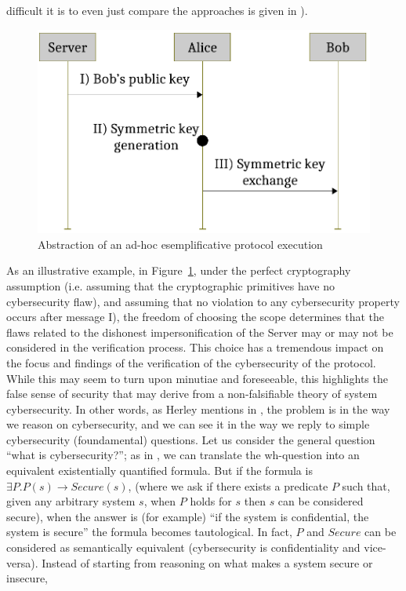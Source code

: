 \documentclass[conference]{IEEEtran}
\begin{document}
difficult it is to even just compare the approaches is given in
\autocite{Cremers2009comparing}). 
\begin{figure}[t]
	\centering
	\includegraphics[width=.7\columnwidth]{protocol-example.pdf}
	\caption{Abstraction of an ad-hoc esemplificative protocol execution}
	\label{fig:protocol-example}
\end{figure}
As an illustrative example, in Figure~\ref{fig:protocol-example}, under the
perfect cryptography assumption (i.e. assuming that the cryptographic
primitives have no cybersecurity flaw), and assuming that no violation to any
cybersecurity property occurs after message I), the freedom of choosing the
scope determines that the flaws related to the dishonest impersonification of
the Server may or may not be considered in the verification process.  This
choice has a tremendous impact on the focus and findings of the verification of
the cybersecurity of the protocol.  While this may seem to turn upon minutiae
and foreseeable, this highlights the false sense of security that may derive
from a non-falsifiable theory of system cybersecurity.  In other words, as
Herley mentions in \autocite{Herley2016usenixvideo}, the problem is in the way
we reason on cybersecurity, and we can see it in the way we reply to simple
cybersecurity (foundamental) questions.  Let us consider the general question
``what is cybersecurity?''; as in \autocite{hintikka2013inquiry}, we can
translate the wh-question into an equivalent existentially quantified formula.
But if the formula is $\exists P. P(s)\rightarrow Secure(s)$, (where we ask if
there exists a predicate $P$ such that, given any arbitrary system $s$, when
$P$ holds for $s$ then $s$ can be considered secure), when the answer is (for
example) ``if the system is confidential, the system is secure'' the formula
becomes tautological. In fact, $P$ and $Secure$ can be considered as
semantically equivalent (cybersecurity is confidentiality and vice-versa).
Instead of starting from reasoning on what makes a system secure or insecure,
\end{document}
